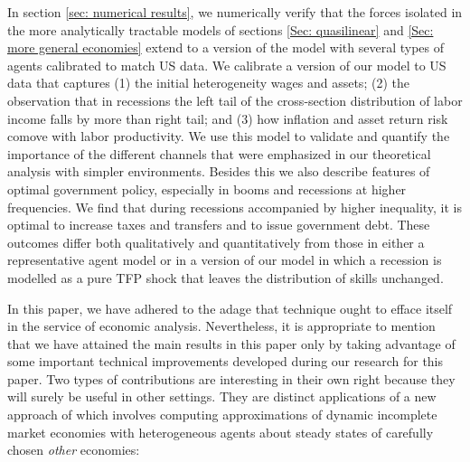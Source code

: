 \documentclass[thmsb,11pt]{article}
\begin{document}


In section \ref{sec: numerical results},
we numerically verify that the forces isolated in the more analytically tractable  models of sections \ref{Sec: quasilinear}
  and \ref{Sec: more general economies} extend to a version of the model with several types of agents  calibrated to match US data.
We calibrate a version of our model to US data that captures (1) the initial heterogeneity wages and assets;
(2) the observation  that  in recessions the left tail of the cross-section distribution of labor income falls by more than right tail; and (3) how inflation and asset return risk comove with labor productivity. We use this model to validate and quantify the importance of the different channels that were emphasized in our theoretical analysis with simpler environments. Besides this we also describe features of optimal government policy, especially in booms and recessions at higher frequencies. We find that during recessions accompanied by higher inequality, it is  optimal to increase taxes and transfers and to issue
government debt. %
These outcomes differ both qualitatively and quantitatively from those in either a representative agent model or in a version
of our model in which a  recession is modelled as a pure TFP shock that leaves the distribution of skills unchanged.

In this paper, we have adhered to the adage that technique ought to  efface itself in the service of economic analysis. Nevertheless, it is appropriate to mention that we have attained the main results in this paper only by taking advantage of some important technical improvements developed during our research for this paper. Two types  of contributions are interesting in their own right because they will surely be useful in other settings. They are distinct applications of a new approach of \cite{Evans2014} which involves computing approximations of dynamic incomplete market economies with heterogeneous agents about steady states of carefully chosen {\em other} economies: 
\end{document}
